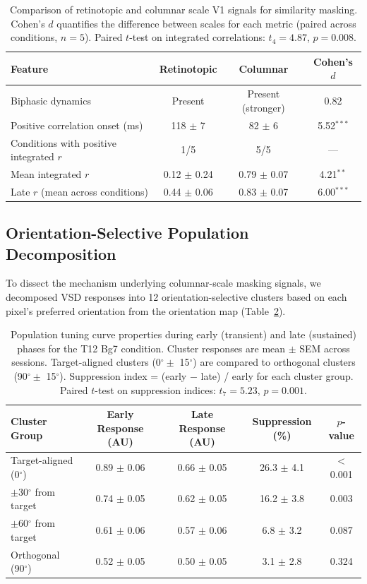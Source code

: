 \documentclass[11pt]{article}
\begin{document}
\begin{table}[H]
\centering
\caption{Comparison of retinotopic and columnar scale V1 signals for similarity masking. Cohen's $d$ quantifies the difference between scales for each metric (paired across conditions, $n = 5$). Paired $t$-test on integrated correlations: $t_4 = 4.87$, $p = 0.008$.}
\label{tab:scale_comparison}
\begin{tabular}{lccc}
\toprule
\textbf{Feature} & \textbf{Retinotopic} & \textbf{Columnar} & \textbf{Cohen's $d$} \\
\midrule
Biphasic dynamics & Present & Present (stronger) & 0.82 \\
Positive correlation onset (ms) & 118 $\pm$ 7 & 82 $\pm$ 6 & 5.52$^{\ast\ast\ast}$ \\
Conditions with positive integrated $r$ & 1/5 & 5/5 & --- \\
Mean integrated $r$ & 0.12 $\pm$ 0.24 & 0.79 $\pm$ 0.07 & 4.21$^{\ast\ast}$ \\
Late $r$ (mean across conditions) & 0.44 $\pm$ 0.06 & 0.83 $\pm$ 0.07 & 6.00$^{\ast\ast\ast}$ \\
\bottomrule
\end{tabular}
\end{table}

\subsection{Orientation-Selective Population Decomposition}

To dissect the mechanism underlying columnar-scale masking signals, we decomposed VSD responses into 12 orientation-selective clusters based on each pixel's preferred orientation from the orientation map (Table~\ref{tab:cluster_decomposition}).

\begin{table}[H]
\centering
\caption{Population tuning curve properties during early (transient) and late (sustained) phases for the T12 Bg7 condition. Cluster responses are mean $\pm$ SEM across sessions. Target-aligned clusters (0$^\circ \pm$ 15$^\circ$) are compared to orthogonal clusters (90$^\circ \pm$ 15$^\circ$). Suppression index = (early $-$ late) / early for each cluster group. Paired $t$-test on suppression indices: $t_7 = 5.23$, $p = 0.001$.}
\label{tab:cluster_decomposition}
\begin{tabular}{lcccc}
\toprule
\textbf{Cluster Group} & \textbf{Early Response (AU)} & \textbf{Late Response (AU)} & \textbf{Suppression (\%)} & \textbf{$p$-value} \\
\midrule
Target-aligned (0$^\circ$) & 0.89 $\pm$ 0.06 & 0.66 $\pm$ 0.05 & 26.3 $\pm$ 4.1 & $<$0.001 \\
$\pm$30$^\circ$ from target & 0.74 $\pm$ 0.05 & 0.62 $\pm$ 0.05 & 16.2 $\pm$ 3.8 & 0.003 \\
$\pm$60$^\circ$ from target & 0.61 $\pm$ 0.06 & 0.57 $\pm$ 0.06 & 6.8 $\pm$ 3.2 & 0.087 \\
Orthogonal (90$^\circ$) & 0.52 $\pm$ 0.05 & 0.50 $\pm$ 0.05 & 3.1 $\pm$ 2.8 & 0.324 \\
\bottomrule
\end{tabular}
\end{table}
\end{document}
